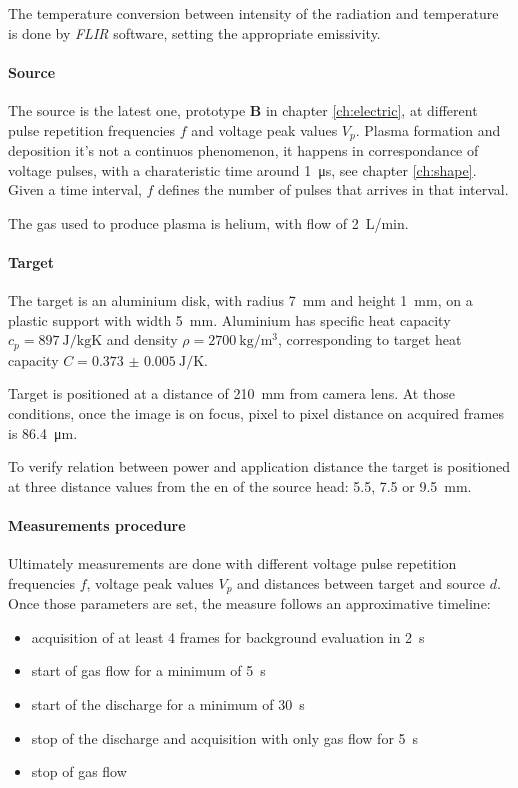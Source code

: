 The temperature conversion between intensity of the radiation and temperature is done by \emph{FLIR} software, setting the appropriate emissivity.

\paragraph{Source}
The source is the latest one, prototype \textbf{B} in chapter \ref{ch:electric}, at different pulse repetition frequencies $f$ and voltage peak values $V_p$. Plasma formation and deposition it's not a continuos phenomenon, it happens in correspondance of voltage pulses, with a charateristic time around \SI{1}{\micro\second}, see chapter \ref{ch:shape}. Given a time interval, $f$ defines the number of pulses that arrives in that interval.

The gas used to produce plasma is helium, with flow of \SI{2}{\liter/\minute}.

\paragraph{Target}
The target is an aluminium disk, with radius \SI{7}{\milli\meter} and height \SI{1}{\milli\meter}, on a plastic support with width \SI{5}{\milli\meter}.
Aluminium has specific heat capacity $c_p = \SI{897}{\joule/\kilogram\kelvin}$ and density $\rho = \SI{2700}{\kilogram/\meter^3}$, corresponding to target heat capacity $C = \SI{0.373(5)}{\joule/\kelvin}$.

Target is positioned at a distance of \SI{210}{\milli\meter} from camera lens. At those conditions, once the image is on focus, pixel to pixel distance on acquired frames is \SI{86.4}{\micro\meter}.

To verify relation between power and application distance the target is positioned at three distance values from the en of the source head: \num{5.5}, \num{7.5} or \SI{9.5}{\milli\meter}.

\paragraph{Measurements procedure}
Ultimately measurements are done with different voltage pulse repetition frequencies $f$, voltage peak values $V_p$ and distances between target and source $d$.
Once those parameters are set, the measure follows an approximative timeline:
\begin{itemize}
 \item acquisition of at least \num{4} frames for background evaluation in \SI{2}{\second}
 \item start of gas flow for a minimum of \SI{5}{\second}
 \item start of the discharge for a minimum of \SI{30}{\second}
 \item stop of the discharge and acquisition with only gas flow for \SI{5}{\second}
 \item stop of gas flow
\end{itemize}

